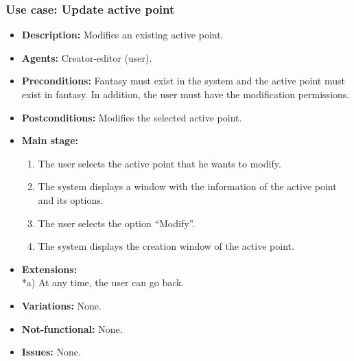 \subsubsection{Use case: Update active point}
\begin{itemize}
	\item \textbf{Description:} Modifies an existing active point.
	\item \textbf{Agents:} Creator-editor (user).
	\item \textbf{Preconditions:} Fantasy must exist in the system and the active point must exist in fantasy. In addition, the user must have the modification permissions.
	\item \textbf{Postconditions:} Modifies the selected active point.
	\item \textbf{Main stage:}
	\begin{enumerate}
		\item The user selects the active point that he wants to modify.
		\item The system displays a window with the information of the active point and its options.
		\item The user selects the option ``Modify''.
		\item The system displays the creation window of the active point.
	\end{enumerate}
	\item \textbf{Extensions:} \\ *a) At any time, the user can go back.
	\item \textbf{Variations:} None.
	\item \textbf{Not-functional:} None.
	\item \textbf{Issues:} None.
\end{itemize}

